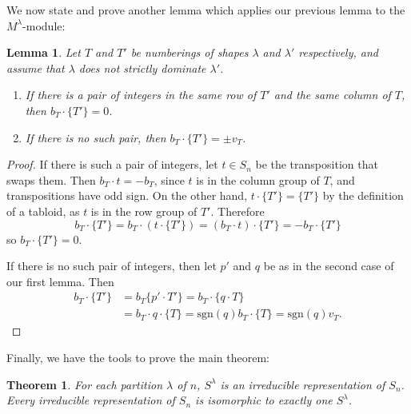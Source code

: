 \documentclass[12pt,twoside]{reedthesis}
\theoremstyle{plain}   %
\newtheorem{thm}{Theorem}[section] %
\newtheorem{lemma}{Lemma}[section]
\theoremstyle{definition}
\theoremstyle{remark}
\numberwithin{equation}{section}
\def\sgn{\mathrm{sgn}}
\begin{document}
  We now state and prove another lemma which applies our previous lemma to the $M^\lambda$-module:
  \begin{lemma}\label{lem2}
    Let $T$ and $T'$ be numberings of shapes $\lambda$ and $\lambda'$ respectively,
    and assume that $\lambda$ does not strictly dominate $\lambda'$. \\
    \begin{enumerate}

    \item If there is a pair of integers in the same row of $T'$ and the same column of $T$, then $b_T \cdot \{T'\} = 0$.
    \item If there is no such pair, then $b_T \cdot \{T'\} = \pm v_T$.
    \end{enumerate}
  \end{lemma}
  \begin{proof}    
    If there is such a pair of integers, let $t \in S_n$ be the transposition that swaps them.
    Then $b_T \cdot t = -b_T$, since $t$ is in the column group of $T$, and transpositions have odd sign.
    On the other hand, $t \cdot \{T'\} = \{T'\}$ by the definition of a tabloid, as $t$ is in the row group of $T'$.
    Therefore
    \[b_T \cdot \{T'\} = b_T \cdot (t \cdot \{T'\}) = (b_T \cdot t) \cdot \{T'\} = - b_T \cdot \{T'\}\]
    so $b_T \cdot \{T'\} = 0$.\par
    If there is no such pair of integers, then let $p'$ and $q$ be as in the second case of our first lemma.
    Then
    \begin{align*}
      b_T \cdot \{ T'\} &=b_T \{p' \cdot T'\} = b_T \cdot \{ q \cdot T\} \\
                        &= b_T \cdot q \cdot \{T\} = \sgn(q) b_T \cdot \{T\} = \sgn(q) v_T.
    \end{align*}
  \end{proof}
  Finally, we have the tools to prove the main theorem:
  \begin{thm}
    For each partition $\lambda$ of $n$, $S^\lambda$ is an irreducible representation of $S_n$. Every irreducible representation of
    $S_n$ is isomorphic to exactly one $S^\lambda$.
  \end{thm}
\end{document}
